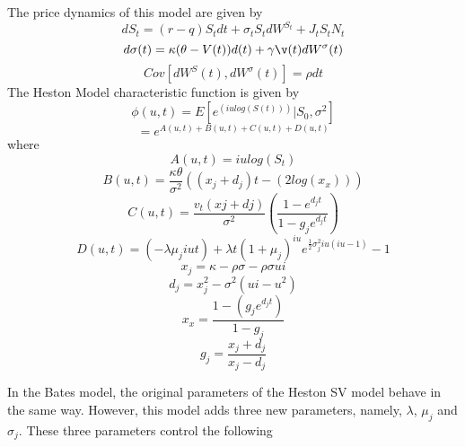 \documentclass{article}
\begin{document}
The price dynamics of this model are given by
\begin{equation}
dS_t = (r- q)S_t dt + \sigma_t S_t dW^{S_t} +J_t S_t N_t
\end{equation}
\begin{equation}
d\sigma(t) = \kappa(\theta-V(t))d(t) + \gamma\v(t)dW^\sigma(t)
\end{equation}
\begin{equation}
Cov[dW^S(t), dW^\sigma(t)] = \rho dt
\end{equation}
The Heston Model characteristic function is given by
\begin{equation}
    \phi(u,t) = E[e^{(iulog(S(t)))}|S_{0}, \sigma^2]
\end{equation}
\begin{equation}
    = e^{A(u,t)+B(u,t)+C(u,t)+D(u,t)}
\end{equation}
where
\begin{equation}
    A(u,t) = iulog(S_t)
\end{equation}
\begin{equation}
    B(u,t) = \frac{\kappa\theta}{\sigma^2}((x_j+d_j)t - (2log(x_x)) )
\end{equation}
\begin{equation}
    C(u,t) = \frac{v_t(xj+dj)}{\sigma^2} (\frac{1-e^{d_j t}}{ 1-g_je^{d_j t}})
\end{equation}
\begin{equation}
    D(u,t) = (-\lambda \mu_j i u t)+\lambda t(1+\mu_j)^{iu} e^{\frac{1}{2} \sigma_j ^2 iu(iu-1)}-1
\end{equation}
\begin{equation}
    x_j = \kappa-\rho\sigma-\rho\sigma ui
\end{equation}
\begin{equation}
    d_j = x_{j}^2 - \sigma^2(ui - u^2)
\end{equation}
\begin{equation}
    x_x = \frac{ 1-(g_j e^{d_j t})}{ 1-g_j}
\end{equation}
\begin{equation}
    g_j = \frac{x_j + d_j}{x_j - d_j}
\end{equation}

In the Bates model, the original parameters of the Heston SV model behave in the same way. However, this model adds three new parameters, namely, $\lambda$, $\mu_j$ and $\sigma_j$. These three parameters control the following
\end{document}
